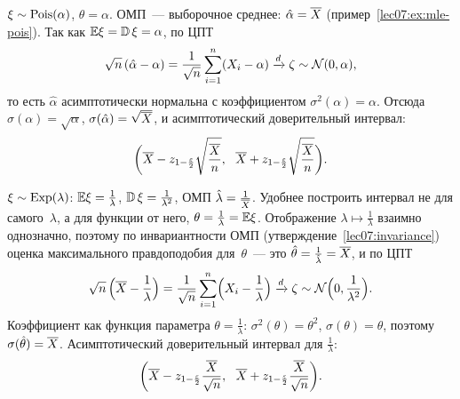 \begin{example}
  \label{lec08:ex:pois}
  $\xi \sim \mathrm{Pois}(\alpha)$, $\theta = \alpha$. ОМП~--- выборочное среднее: $\hat\alpha = \overline{X}$
  (пример~\ref{lec07:ex:mle-pois}). Так как $\mathbb{E}\xi = \operatorname{\mathbb{D}}\xi = \alpha$, по ЦПТ
  \[
    \sqrt{n}\,(\hat\alpha - \alpha) = \frac{1}{\sqrt n} \sum_{i=1}^n (X_i - \alpha) \xrightarrow{d} \zeta \sim \mathcal{N}(0, \alpha),
  \]
  то есть $\hat\alpha$ асимптотически нормальна с коэффициентом $\sigma^2(\alpha) = \alpha$.
  Отсюда $\sigma(\alpha) = \sqrt\alpha$, $\sigma(\hat\alpha) = \sqrt{\overline{X}}$, и асимптотический
  доверительный интервал:
  \[
    \biggl( \overline{X} - z_{1 - \frac{\varepsilon}2} \sqrt{\frac{\overline{X}}{n}},\ \
            \overline{X} + z_{1 - \frac{\varepsilon}2} \sqrt{\frac{\overline{X}}{n}} \biggr).
  \]
\end{example}

\begin{example}
  \label{lec08:ex:exp}
  $\xi \sim \mathrm{Exp}(\lambda)$: $\mathbb{E}\xi = \frac1\lambda$, $\operatorname{\mathbb{D}}\xi = \frac{1}{\lambda^2}$, ОМП
  $\hat\lambda = \frac{1}{\overline{X}}$. Удобнее построить интервал не для самого~$\lambda$, а для
  функции от него, $\theta = \frac1\lambda = \mathbb{E}\xi$. Отображение $\lambda \mapsto \frac1\lambda$
  взаимно однозначно, поэтому по инвариантности ОМП (утверждение~\ref{lec07:invariance})
  оценка максимального правдоподобия для~$\theta$~--- это $\hat\theta = \frac{1}{\hat\lambda} = \overline{X}$,
  и по ЦПТ
  \[
    \sqrt{n}\,\Bigl(\overline{X} - \frac1\lambda\Bigr) = \frac{1}{\sqrt n} \sum_{i=1}^n \Bigl(X_i - \frac1\lambda\Bigr)
    \xrightarrow{d} \zeta \sim \mathcal{N}\Bigl(0, \frac{1}{\lambda^2}\Bigr).
  \]
  Коэффициент как функция параметра $\theta = \frac1\lambda$: $\sigma^2(\theta) = \theta^2$,
  $\sigma(\theta) = \theta$, поэтому $\sigma(\hat\theta) = \overline{X}$. Асимптотический доверительный
  интервал для $\frac1\lambda$:
  \[
    \biggl( \overline{X} - z_{1 - \frac{\varepsilon}2} \frac{\overline{X}}{\sqrt n},\ \
            \overline{X} + z_{1 - \frac{\varepsilon}2} \frac{\overline{X}}{\sqrt n} \biggr).
  \]
\end{example}


